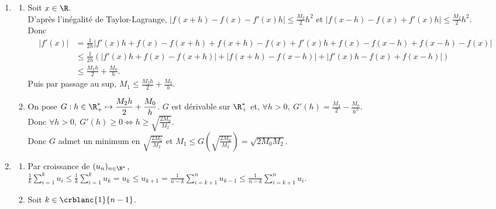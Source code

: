 \documentclass{book}
\begin{document}
\begin{enumerate}[leftmargin=*]
\begin{enumerate}[label=\alph*.]
$$\begin{pmatrix}
				n-1&(n-1)^2&\cdots&(n-1)^{n-1}
			\end{pmatrix}$$
			Son déterminant est $(n-1)!\displaystyle\prod_{1\leq i<j\leq n-1}(j-i)\ne 0$ donc elle est inversible.\\
			Ainsi, on a $\normep{\infty}{X(x)}=\normep{\infty}{A^{-1}AX(x)}\leq{|||A^{-1}|||}_\infty\normep{\infty}{AX(x)}\leq K{|||A^{-1}|||}_\infty$.\\
			Ceci étant vrai pour tout $x\in \R$, on obtient par passage au sup que $\forall k\in \crblanc{1}{n},\ M_k\leq K{|||A^{-1}|||}_\infty<+\infty$.
		\end{enumerate}
		\item
		\begin{enumerate}[label=\alph*.]
			\item Soit $x\in \R$.\\
			D'après l'inégalité de Taylor-Lagrange, $|f(x+h)-f(x)-f'(x)h|\leq \displaystyle\frac{M_2}{2}h^2$ et $|f(x-h)-f(x)+f'(x)h|\leq \displaystyle\frac{M_2}{2}h^2$.\\
			Donc \begin{align*}
				|f'(x)|&=\frac{1}{2h}|f'(x)h+f(x)-f(x+h)+f(x+h)-f(x)+f'(x)h+f(x)-f(x-h)+f(x-h)-f(x)|\\
				&\leq\frac{1}{2h}(|f'(x)h+f(x)-f(x+h)|+|f(x+h)-f(x-h)|+|f'(x)h-f(x)+f(x-h)|)\\
				&\leq\frac{M_2h}{2}+\frac{M_0}{h}.
			\end{align*}
			Puis par passage au sup, $M_1\leq \displaystyle\frac{M_2h}{2}+\frac{M_0}{h}$.
			\item On pose $G:h\in \R^*_+\mapsto \displaystyle\frac{M_2h}{2}+\frac{M_0}{h}$. $G$ est dérivable sur $\R^*_+$ et, $\forall h>0,\ G'(h)=\displaystyle\frac{M_2}{2}-\frac{M_0}{h^2}$.\\
			Donc $\forall h>0,\ G'(h)\geq 0\iff h\geq \displaystyle\sqrt{\frac{2M_0}{M_2}}$.\\
			Donc $G$ admet un minimum en $\displaystyle\sqrt{\frac{2M_0}{M_2}}$ et $M_1\leq G\left(\displaystyle\sqrt{\frac{2M_0}{M_2}}\right)=\sqrt{2M_0M_2}$.
		\end{enumerate}
		\item
		\begin{enumerate}[label=\alph*.]
			\item Par croissance de $(u_n)_{n\in \N^*}$,\\
			$\displaystyle\frac{1}{k}\sum_{i=1}^ku_i\leq \frac{1}{k}\sum_{i=1}^ku_k=u_k\leq u_{k+1}=\frac{1}{n-k}\sum_{i=k+1}^nu_{k-1}\leq \frac{1}{n-k}\sum_{i=k+1}^nu_i$.
			\item Soit $k\in \crblanc{1}{n-1}$.

\end{enumerate}
\end{enumerate}
\end{document}
